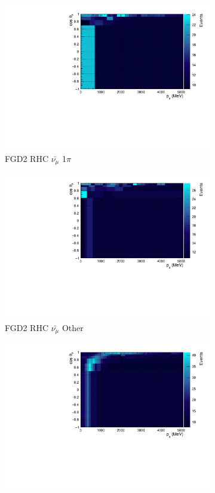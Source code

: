 \begin{figure}
\begin{subfigure}{.32\textwidth}
  \includegraphics[width=0.95\linewidth]{figs/TH2PolyNom_MC_FGD2_anti-numuCC_1pi}
  \caption{FGD2 RHC $\bar{\nu_{\mu}}$ 1$\pi$}
  \label{fig:th2polyth2polynomFGD2_anti-numuCC_1pi}
\end{subfigure}
\begin{subfigure}{.32\textwidth}
  \centering
  \includegraphics[width=0.95\linewidth]{figs/TH2PolyNom_MC_FGD2_anti-numuCC_other}
  \caption{FGD2 RHC $\bar{\nu_{\mu}}$ Other}
  \label{fig:th2polynomFGD2_anti-numuCC_other}
\end{subfigure}
\begin{subfigure}{.32\textwidth}
  \centering
  \includegraphics[width=0.95\linewidth]{figs/TH2PolyNom_MC_FGD1_NuMuBkg_CC0pi_in_AntiNu_Mode}

\end{subfigure}
\end{figure}
